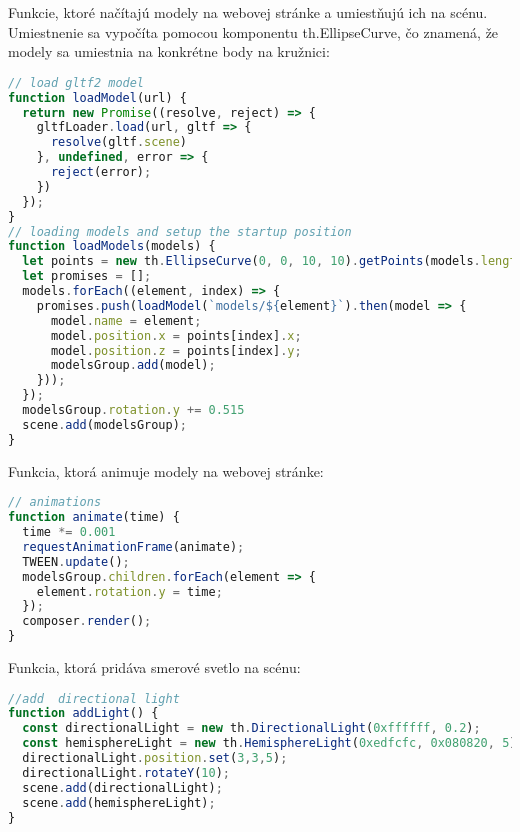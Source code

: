         Funkcie, ktoré načítajú modely na webovej stránke a umiestňujú ich na scénu. Umiestnenie sa vypočíta pomocou komponentu th.EllipseCurve, čo znamená, že modely sa umiestnia na konkrétne body na kružnici:
\begin{lstlisting}[language=javascript]
// load gltf2 model
function loadModel(url) {
  return new Promise((resolve, reject) => {
    gltfLoader.load(url, gltf => {
      resolve(gltf.scene)
    }, undefined, error => {
      reject(error);
    })
  });
}
// loading models and setup the startup position
function loadModels(models) {
  let points = new th.EllipseCurve(0, 0, 10, 10).getPoints(models.length);
  let promises = [];
  models.forEach((element, index) => {
    promises.push(loadModel(`models/${element}`).then(model => {
      model.name = element;
      model.position.x = points[index].x;
      model.position.z = points[index].y;
      modelsGroup.add(model);
    }));
  });
  modelsGroup.rotation.y += 0.515
  scene.add(modelsGroup);
}
\end{lstlisting}

        Funkcia, ktorá animuje modely na webovej stránke:
\begin{lstlisting}[language=javascript]
// animations
function animate(time) {
  time *= 0.001
  requestAnimationFrame(animate);
  TWEEN.update();
  modelsGroup.children.forEach(element => {
    element.rotation.y = time;
  });
  composer.render();
}
\end{lstlisting}

        Funkcia, ktorá pridáva smerové svetlo na scénu:
\begin{lstlisting}[language=javascript]
//add  directional light
function addLight() {
  const directionalLight = new th.DirectionalLight(0xffffff, 0.2);
  const hemisphereLight = new th.HemisphereLight(0xedfcfc, 0x080820, 5);
  directionalLight.position.set(3,3,5);
  directionalLight.rotateY(10);
  scene.add(directionalLight);
  scene.add(hemisphereLight);
}
\end{lstlisting}

